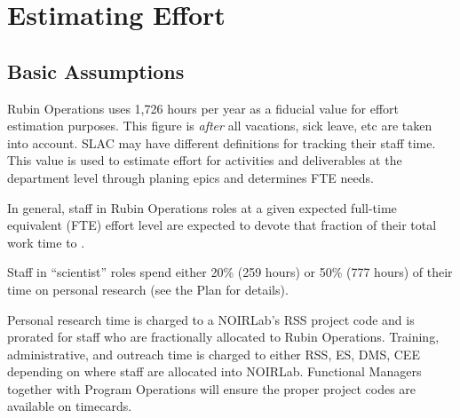 \section{Estimating Effort}
\label{sec:effort}

\subsection{Basic Assumptions}


\gls{Rubin Operations} uses 1,726 hours per year as a fiducial value for effort estimation purposes. This figure is \emph{after} all vacations, sick leave, etc are taken into account. \gls{SLAC} may have different definitions for tracking their staff time. This value is used to estimate effort for activities and deliverables at the department level through planing epics and determines FTE needs.

In general, staff in \gls{Rubin Operations} roles at a given expected full-time equivalent (\gls{FTE}) effort level are expected to devote that fraction of their total work time to \RO.


Staff in ``scientist'' roles spend either 20\% (259 hours) or 50\% (777 hours) of their time on personal research (see the  Plan for details).

Personal research time is charged to a \gls{NOIRLab}'s \gls{RSS} project code and is prorated for staff who are fractionally allocated to \gls{Rubin Operations}.
Training, administrative, and outreach time is charged to either \gls{RSS}, \gls{ES}, \gls{DMS}, \gls{CEE} depending on where staff are allocated into \gls{NOIRLab}.
Functional Managers together with Program Operations will ensure the proper project codes are available on timecards.

